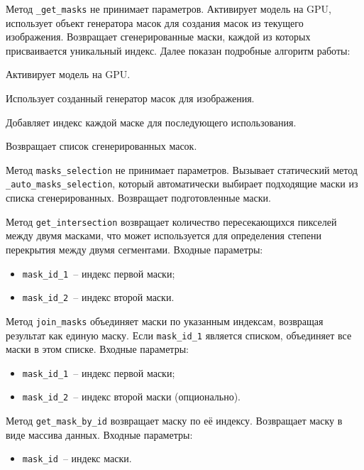 Метод \lstinline{_get_masks} не принимает параметров. Активирует модель на GPU, использует объект генератора масок для создания масок из текущего изображения. Возвращает сгенерированные маски, каждой из которых присваивается уникальный индекс. Далее показан подробные алгоритм работы: 

\begin{enumerate_num}
    \item Активирует модель на GPU.
    \item Использует созданный генератор масок для изображения.
    \item Добавляет индекс каждой маске для последующего использования.
    \item Возвращает список сгенерированных масок.
\end{enumerate_num}

Метод \lstinline{masks_selection} не принимает параметров. Вызывает статический метод \lstinline{_auto_masks_selection}, который автоматически выбирает подходящие маски из списка сгенерированных. Возвращает подготовленные маски.

Метод \lstinline{get_intersection} возвращает количество пересекающихся пикселей между двумя масками, что может используется для определения степени перекрытия между двумя сегментами. Входные параметры:

\begin{itemize}
    \item \lstinline{mask_id_1}~-- индекс первой маски;
    \item \lstinline{mask_id_2}~-- индекс второй маски.
\end{itemize}

Метод \lstinline{join_masks} объединяет маски по указанным индексам, возвращая результат как единую маску. Если \lstinline{mask_id_1} является списком, объединяет все маски в этом списке. Входные параметры:

\begin{itemize}
    \item \lstinline{mask_id_1}~-- индекс первой маски; 
    \item \lstinline{mask_id_2}~-- индекс второй маски (опционально).
\end{itemize}

Метод \lstinline{get_mask_by_id} возвращает маску по её индексу. Возвращает маску в виде массива данных. Входные параметры:

\begin{itemize}
    \item \lstinline{mask_id}~-- индекс маски.
\end{itemize}

